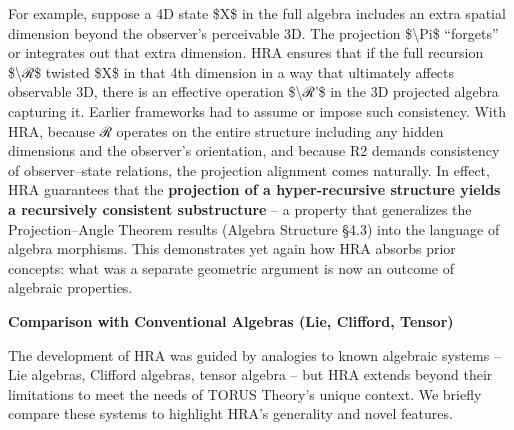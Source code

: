 \documentclass[]{article}
\begin{document}
For example, suppose a 4D state \$X\$ in the full algebra includes an
extra spatial dimension beyond the observer's perceivable 3D. The
projection \$\textbackslash{}Pi\$ ``forgets'' or integrates out that
extra dimension. HRA ensures that if the full recursion
\$\textbackslash{}ℛ\$ twisted \$X\$ in that 4th dimension in a way that
ultimately affects observable 3D, there is an effective operation
\$\textbackslash{}ℛ'\$ in the 3D projected algebra capturing it. Earlier
frameworks had to assume or impose such consistency. With HRA, because ℛ
operates on the entire structure including any hidden dimensions and the
observer's orientation, and because R2 demands consistency of
observer--state relations, the projection alignment comes naturally. In
effect, HRA guarantees that the \textbf{projection of a hyper-recursive
structure yields a recursively consistent substructure} -- a property
that generalizes the Projection--Angle Theorem results (Algebra
Structure §4.3) into the language of algebra morphisms. This
demonstrates yet again how HRA absorbs prior concepts: what was a
separate geometric argument is now an outcome of algebraic properties.

\textbf{Comparison with Conventional Algebras (Lie, Clifford, Tensor)}

The development of HRA was guided by analogies to known algebraic
systems -- Lie algebras, Clifford algebras, tensor algebra -- but HRA
extends beyond their limitations to meet the needs of TORUS Theory's
unique context. We briefly compare these systems to highlight HRA's
generality and novel features.
\end{document}
